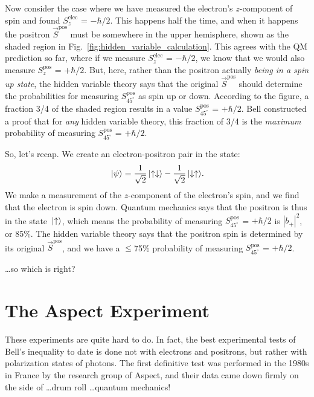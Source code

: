 Now consider the case where we have measured the electron's $z$-component
of spin and found $S_z^\text{elec}$ = $-\hbar/2$.  This happens half
the time, and when it happens the positron $\vec S^\text{pos}$ must
be somewhere in the upper hemisphere, shown as the shaded region in
Fig.~\ref{fig:hidden_variable_calculation}.  This agrees with the QM
prediction so far, where if we measure $S_z^\text{elec}$ = $-\hbar/2$, we
know that we would also measure $S_z^\text{pos}$ = $+\hbar/2$.  But, here,
rather than the positron actually \emph{being in a spin up state}, the
hidden variable theory says that the original $\vec S^\text{pos}$ should
determine the probabilities for measuring  $S_{45^\circ}^\text{pos}$ as
spin up or down.  According to the figure, a fraction 3/4 of the shaded
region results in a value $S_{45^\circ}^\text{pos}$  = $+\hbar/2$.
Bell constructed a proof that for \emph{any} hidden variable theory,
this fraction of 3/4 is the \emph{maximum} probability of measuring
$S_{45^\circ}^\text{pos}$ = $+\hbar/2$.

So, let's recap.  We create an electron-positron pair in the state:
\begin{equation}
 \,|\mbox{$\psi$}\rangle = \frac{1}{\sqrt{2}}\,|\mbox{$\uparrow\downarrow$}\rangle
 - \frac{1}{\sqrt{2}}\,|\mbox{$\downarrow\uparrow$}\rangle.
\end{equation}
We make a measurement of the $z$-component of the electron's spin,
and we find that the electron is spin down.  Quantum mechanics says
that the positron is thus in the state $\,|\mbox{$\uparrow$}\rangle$, which means
the probability of measuring $S_{45^\circ}^\text{pos}$  = $+\hbar/2$
is $\left|b_+\right|^2$, or 85\%.  The hidden variable theory says that
the positron spin is determined by its original $\vec S^\text{pos}$, and
we have a $\le$75\% probability of measuring $S_{45^\circ}^\text{pos}$
= $+\hbar/2$.

\bigskip

\noindent\dots so which is right?

\section{The Aspect Experiment}
\label{sec:aspect_experiment}

These experiments are quite hard to do.  In fact, the best
experimental tests of Bell's inequality to date is done not with
electrons and positrons, but rather with polarization states of
photons.  The first definitive test was performed in the 1980s in
France by the research group of Aspect, and their data came
down firmly on the side of \dots drum roll \dots quantum mechanics!  

